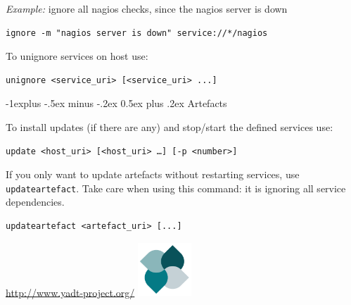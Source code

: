 \documentclass[10pt,landscape]{article}
\makeatletter
\renewcommand{\subsection}{\@startsection{subsection}{2}{0mm}%
                                {-1explus -.5ex minus -.2ex}%
                                {0.5ex plus .2ex}%
                                {\normalfont\normalsize\bfseries}}
\makeatother
\begin{document}
\begin{multicols}{3}
\emph{Example:} ignore all nagios checks, since the nagios server is down
\begin{lstlisting}
ignore -m "nagios server is down" service://*/nagios
\end{lstlisting}

To unignore services on host use:
\begin{lstlisting}
unignore <service_uri> [<service_uri> ...]
\end{lstlisting}



\vfill\columnbreak
\subsection{Artefacts}

To install updates (if there are any) and stop/start the defined services use:
\begin{lstlisting}
update <host_uri> [<host_uri> …] [-p <number>]
\end{lstlisting}

If you only want to update artefacts without restarting services,
use \verb+updateartefact+. Take care when using this command:
it is ignoring all service dependencies.
\begin{lstlisting}
updateartefact <artefact_uri> [...]
\end{lstlisting}



\scriptsize
\hfill\href{http://www.yadt-project.org/}{http://www.yadt-project.org/}
\includegraphics[width=2cm]{res/yadtlogo}

\end{multicols}
\end{document}
